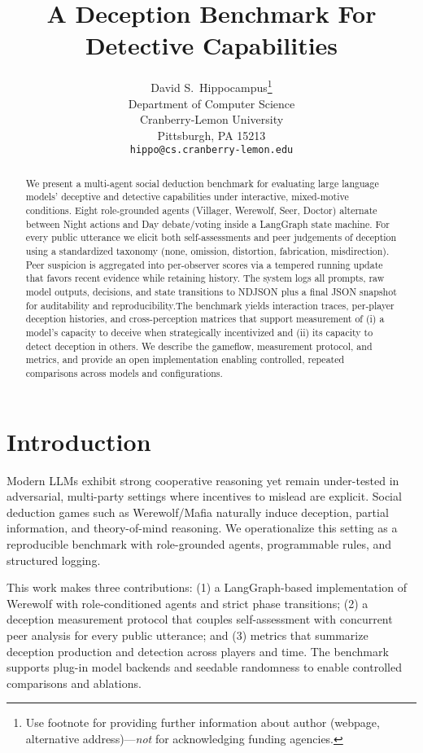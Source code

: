 \documentclass{article}
\title{A Deception Benchmark For Detective Capabilities}
\author{%
  David S.~Hippocampus\thanks{Use footnote for providing further information
    about author (webpage, alternative address)---\emph{not} for acknowledging
    funding agencies.} \\
  Department of Computer Science\\
  Cranberry-Lemon University\\
  Pittsburgh, PA 15213 \\
  \texttt{hippo@cs.cranberry-lemon.edu} \\
}
\begin{document}
\maketitle

\begin{abstract}
We present a multi-agent social deduction benchmark for evaluating large language models’ deceptive and detective capabilities under interactive, mixed-motive conditions. Eight role-grounded agents (Villager, Werewolf, Seer, Doctor) alternate between Night actions and Day debate/voting inside a LangGraph state machine. For every public utterance we elicit both self-assessments and peer judgements of deception using a standardized taxonomy (none, omission, distortion, fabrication, misdirection). Peer suspicion is aggregated into per-observer scores via a tempered running update that favors recent evidence while retaining history. The system logs all prompts, raw model outputs, decisions, and state transitions to NDJSON plus a final JSON snapshot for auditability and reproducibility.The benchmark yields interaction traces, per-player deception histories, and cross-perception matrices that support measurement of (i) a model’s capacity to deceive when strategically incentivized and (ii) its capacity to detect deception in others. We describe the gameflow, measurement protocol, and metrics, and provide an open implementation enabling controlled, repeated comparisons across models and configurations.
\end{abstract}

\section{Introduction}
Modern LLMs exhibit strong cooperative reasoning yet remain under-tested in adversarial, multi-party settings where incentives to mislead are explicit. Social deduction games such as Werewolf/Mafia naturally induce deception, partial information, and theory-of-mind reasoning. We operationalize this setting as a reproducible benchmark with role-grounded agents, programmable rules, and structured logging.

This work makes three contributions: (1) a LangGraph-based implementation of Werewolf with role-conditioned agents and strict phase transitions; (2) a deception measurement protocol that couples self-assessment with concurrent peer analysis for every public utterance; and (3) metrics that summarize deception production and detection across players and time. The benchmark supports plug-in model backends and seedable randomness to enable controlled comparisons and ablations.
\end{document}
